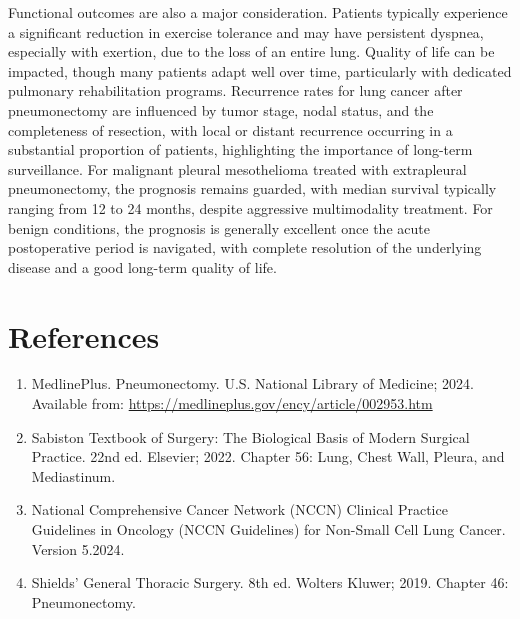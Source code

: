 Functional outcomes are also a major consideration. Patients typically experience a significant reduction in exercise tolerance and may have persistent dyspnea, especially with exertion, due to the loss of an entire lung. Quality of life can be impacted, though many patients adapt well over time, particularly with dedicated pulmonary rehabilitation programs. Recurrence rates for lung cancer after pneumonectomy are influenced by tumor stage, nodal status, and the completeness of resection, with local or distant recurrence occurring in a substantial proportion of patients, highlighting the importance of long-term surveillance. For malignant pleural mesothelioma treated with extrapleural pneumonectomy, the prognosis remains guarded, with median survival typically ranging from 12 to 24 months, despite aggressive multimodality treatment. For benign conditions, the prognosis is generally excellent once the acute postoperative period is navigated, with complete resolution of the underlying disease and a good long-term quality of life.

\section*{References}
\begin{enumerate}
  \item MedlinePlus. Pneumonectomy. U.S. National Library of Medicine; 2024. Available from: \url{https://medlineplus.gov/ency/article/002953.htm}
  
  \item Sabiston Textbook of Surgery: The Biological Basis of Modern Surgical Practice. 22nd ed. Elsevier; 2022. Chapter 56: Lung, Chest Wall, Pleura, and Mediastinum.
  
  \item National Comprehensive Cancer Network (NCCN) Clinical Practice Guidelines in Oncology (NCCN Guidelines\textregistered) for Non-Small Cell Lung Cancer. Version 5.2024.
  
  \item Shields' General Thoracic Surgery. 8th ed. Wolters Kluwer; 2019. Chapter 46: Pneumonectomy.
\end{enumerate}

\clearpage
